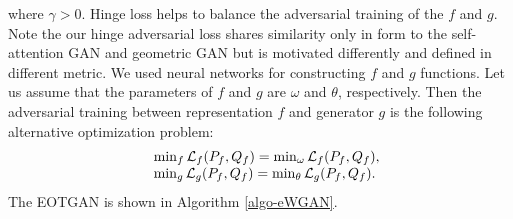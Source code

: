 where $\gamma>0$. Hinge loss helps to balance the adversarial
training of the $f$ and $g$.
Note the our hinge adversarial loss shares similarity only in form to the self-attention
GAN\cite{2018arXiv180508318Z} and geometric GAN\cite{2017arXiv170502894L}
but is motivated differently and defined in different metric. 
We used neural networks for constructing $f$ and $g$ functions. Let us assume that 
the parameters of $f$ and $g$ are $\omega$ and $\theta$, respectively.
Then the adversarial training between representation $f$ and
generator $g$ is the following alternative optimization problem:\vspace{-2pt}
\begin{equation}
  \begin{array}{rl}
    &\min_{f} \Ll_f(P_f, Q_f) = \min_{\omega} \Ll_f(P_f, Q_f), \\ 
    &\min_{g} \Ll_g(P_f, Q_f) = \min_{\th} \Ll_{g}(P_f, Q_f).
  \end{array}\vspace{-2pt}
\end{equation}
The EOTGAN is shown in Algorithm \ref{algo-eWGAN}.




